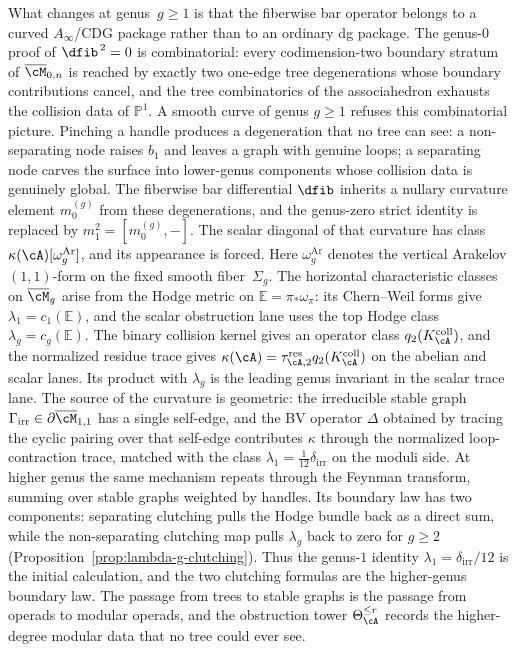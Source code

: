 What changes at genus~$g \geq 1$ is that the fiberwise bar operator
belongs to a curved $A_\infty$/CDG package rather than to an ordinary
dg package.
The genus-$0$ proof of $\dfib^{\,2} = 0$ is combinatorial:
every codimension-two
boundary stratum of $\overline{\cM}_{0,n}$ is reached by exactly
two one-edge tree degenerations whose boundary contributions
cancel, and the tree combinatorics of the associahedron exhausts
the collision data of $\mathbb{P}^1$. A smooth curve of genus
$g \geq 1$ refuses this combinatorial picture. Pinching a
handle produces a degeneration that no tree can see: a
non-separating node raises $b_1$ and leaves a graph with
genuine loops; a separating node carves the surface into
lower-genus components whose collision data is genuinely
global. The fiberwise bar differential $\dfib$ inherits a nullary
curvature element $m_0^{(g)}$ from these degenerations, and the
genus-zero strict identity is replaced by
$m_1^2=[m_0^{(g)},-]$. The scalar diagonal of that curvature has class
$\kappa(\cA)[\omega_g^{\mathrm{Ar}}]$, and its appearance is forced.
Here $\omega_g^{\mathrm{Ar}}$ denotes the vertical Arakelov
$(1,1)$-form on the fixed smooth fiber~$\Sigma_g$.  The horizontal
characteristic classes on $\overline{\cM}_g$ arise from the Hodge
metric on $\mathbb{E}=\pi_*\omega_\pi$: its Chern--Weil forms give
$\lambda_1=c_1(\mathbb{E})$, and the scalar obstruction lane uses
the top Hodge class $\lambda_g=c_g(\mathbb{E})$.  The binary
collision kernel gives an operator class
$q_2(K_\cA^{\mathrm{coll}})$, and the normalized residue trace gives
$\kappa(\cA)=\tau_{\cA,2}^{\mathrm{res}}
q_2(K_\cA^{\mathrm{coll}})$ on the abelian and scalar lanes.  Its
product with $\lambda_g$ is the leading genus invariant in the scalar
trace lane. The source of the curvature is
geometric: the irreducible stable graph
$\Gamma_{\mathrm{irr}} \in \partial\overline{\cM}_{1,1}$ has a
single self-edge, and the BV operator $\Delta$ obtained by
tracing the cyclic pairing over that self-edge contributes
$\kappa$ through the normalized loop-contraction trace, matched with the class
$\lambda_1 = \tfrac{1}{12}\delta_{\mathrm{irr}}$ on the moduli side.
At higher genus the same mechanism repeats through the Feynman
transform, summing over stable graphs weighted by handles.  Its
boundary law has two components: separating clutching pulls the Hodge
bundle back as a direct sum, while
the non-separating clutching map pulls $\lambda_g$ back to zero for
$g\ge2$ (Proposition~\ref{prop:lambda-g-clutching}). Thus the
genus-$1$ identity $\lambda_1=\delta_{\mathrm{irr}}/12$ is the
initial calculation, and the two clutching formulas are the
higher-genus boundary law. The passage
from trees to stable graphs is the passage from operads to modular
operads, and the obstruction tower $\Theta_\cA^{\leq r}$ records the
higher-degree modular data that no tree could ever see.

